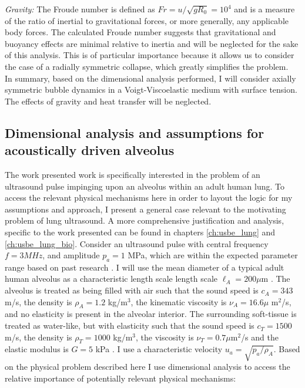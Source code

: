 \noindent\textit{Gravity:} The Froude number is defined as
$Fr = u/\sqrt{g R_0}=10^4$ and is a measure of the ratio of inertial to
gravitational forces, or more generally, any applicable body
forces. The calculated Froude number suggests that gravitational and
buoyancy effects are minimal relative to inertia and will be neglected
for the sake of this analysis. This is of particular importance
because it allows us to consider the case of a radially symmetric
collapse, which greatly simplifies the problem.\\

In summary, based on the dimensional analysis performed, I will
consider axially symmetric bubble dynamics in a Voigt-Viscoelastic
medium with surface tension. The effects of gravity and heat transfer
will be neglected.

\subsection{Dimensional analysis and assumptions for acoustically driven alveolus}%
\label{sec:lung_assumptions}%
The work presented work is specifically interested in the problem of
an ultrasound pulse impinging upon an alveolus within an adult human
lung. To access the relevant physical mechanisms here in order to
layout the logic for my assumptions and approach, I present a general
case relevant to the motivating problem of lung ultrasound. A more
comprehensive justification and analysis, specific to the work
presented can be found in chapters \ref{ch:usbe_lung} and
\ref{ch:usbe_lung_bio}. Consider an ultrasound pulse with central
frequency $f = 3 MHz$, and amplitude $p_a = 1$ MPa, which are within
the expected parameter range based on past research
\citep{Miller2015a}. I will use the mean diameter of a typical adult
human alveolus as a characteristic length scale length scale
$\ell_A = 200 \mu$m \citep{Ochs2004}. The alveolus is treated as being
filled with air such that the sound speed is $c_A=343$ m/s, the
density is $\rho_A = 1.2$ kg/m$^3$, the kinematic viscosity is
$\nu_A = 16.6 \mu$ m$^2$/s, and no elasticity is present in the
alveolar interior. The surrounding soft-tissue is treated as
water-like, but with elasticity such that the sound speed is
$c_T=1500$ m/s, the density is $\rho_T=1000$ kg/m$^3$, the viscosity is
$\nu_T = 0.7 \mu$m$^2$/s and the elastic modulus is $G = 5$ kPa
\citep{Cavalcante2005}. I use a characteristic velocity
$u_a = \sqrt{p_a/\rho_A}$. Based on the physical problem described here I
use dimensional analysis to access the relative importance of
potentially relevant physical mechanisms:\\

